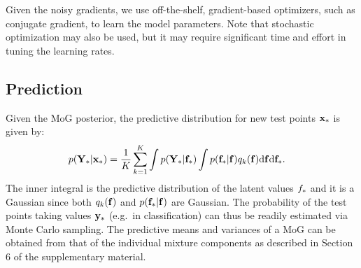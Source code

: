 Given the noisy gradients, we use off-the-shelf, gradient-based optimizers, such as conjugate gradient, to learn the model parameters.
Note that stochastic optimization may also be used, but it may require significant time 
and effort in tuning the learning rates.


\subsection{Prediction}
Given the MoG posterior, the predictive distribution for new test points $\mathbf{x}_*$ is given by:
\begin{align}
p(\mathbf{Y}_{*} | \mathbf{x}_*) 
&= \frac{1}{K} \sum_{k=1}^K \int p(\mathbf{Y}_{*} | \mathbf{f}_*) \int p(\mathbf{f}_* | \mathbf{f}) q_k(\mathbf{f}) \mathrm{d} \mathbf{f} \mathrm{d} \mathbf{f}_*. 
\end{align}
The inner integral is the predictive distribution of the latent values $f_*$ and it is  a Gaussian since both $q_k(\mathbf{f})$ and $p(\mathbf{f}_* | \mathbf{f})$ are Gaussian.
The probability of the test points taking values $\mathbf{y}_{*}$ (e.g.~in classification) can thus be readily estimated via Monte Carlo sampling.
The predictive means and variances of a MoG can be obtained from that of the individual mixture components as described in Section 6 of the supplementary material.







